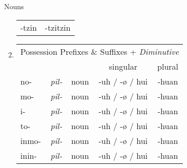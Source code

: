 \documentclass[12pt]{beamer}
\newcommand{\nah}[1]{\textcolor{nahgrn}{#1}}
\newcommand{\trs}[1]{\textcolor{nahblu}{#1}}
\begin{document}
\begin{frame}
\begin{columns}[t]
\begin{column}{.23\linewidth}
\begin{block}{Nouns}
\begin{enumerate}
\begin{tabular}[t]{c|c}
				\trs{-tzin}   & \trs{-tzitzin}         \\
			\end{tabular}%
			\item \begin{tabular}[t]{lcccc}
				\multicolumn{5}{l}{Possession \nah{Prefixes} \& \trs{Suffixes} + \textit{Diminutive}}    	   		       \\
							&	  &		 & singular 						& plural	   \\
				\cline{1-5}
				\nah{no-} 	& \textit{pil-} & noun & \trs{-uh} / \trs{-ø} / \trs{hui} & \trs{-huan}\\
				\nah{mo-} 	& \textit{pil-} & noun & \trs{-uh} / \trs{-ø} / \trs{hui} & \trs{-huan}\\
				\nah{i-}  	& \textit{pil-} & noun & \trs{-uh} / \trs{-ø} / \trs{hui} & \trs{-huan}\\
				\nah{to-} 	& \textit{pil-} & noun & \trs{-uh} / \trs{-ø} / \trs{hui} & \trs{-huan}\\
				\nah{inmo-} & \textit{pil-} & noun & \trs{-uh} / \trs{-ø} / \trs{hui} & \trs{-huan}\\
				\nah{inin-} & \textit{pil-} & noun & \trs{-uh} / \trs{-ø} / \trs{hui} & \trs{-huan}\\

\end{tabular}
\end{enumerate}
\end{block}
\end{column}
\end{columns}
\end{frame}
\end{document}
